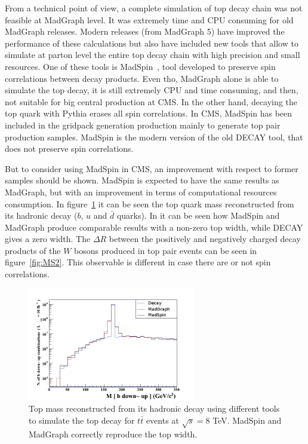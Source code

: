 From a technical point of view, a complete simulation of top decay chain was not feasible at MadGraph level. It was extremely time and CPU consuming for old MadGraph releases. Modern releases (from MadGraph 5) have improved the performance of these calculations but also have included new tools that allow to simulate at parton level the entire top decay chain with high precision and small resources. One of these tools is MadSpin~\cite{Artoisenet:2012st, Frixione:2007zp}, tool developed to preserve spin correlations between decay products. Even tho, MadGraph alone is able to simulate the top decay, it is still extremely CPU and time consuming, and then, not suitable for big central production at CMS. In the other hand, decaying the top quark with Pythia erases all spin correlations. In CMS, MadSpin has been included in the gridpack generation production mainly to generate top pair production samples. MadSpin is the modern version of the old DECAY tool, that does not preserve spin correlations.

But to consider using MadSpin in CMS, an improvement with respect to former samples should be shown. MadSpin is expected to have the same results as MadGraph, but with an improvement in terms of computational resources consumption. In figure~\ref{fig:MS1} it can be seen the top quark mass reconstructed from its hadronic decay ($b$, $u$ and $\bar{d}$ quarks). In it can be seen how MadSpin and MadGraph produce comparable results with a non-zero top width, while DECAY gives a zero width. The $\Delta R$ between the positively and negatively charged decay products of the $W$ bosons produced in top pair events can be seen in figure~\ref{fig:MS2}. This observable is different in case there are or not spin correlations. 

\begin{figure}[!Hhtbp]
  \begin{center}
    \includegraphics[width=0.65\textwidth]{figs/TT_MadSPin_1.png}
    \caption{Top mass reconstructed from its hadronic decay using different tools to simulate the top decay for $t\bar{t}$ events at $\sqrt{s}=8$ TeV. MadSpin and MadGraph correctly reproduce the top width.}
    \label{fig:MS1}
  \end{center}
\end{figure}

